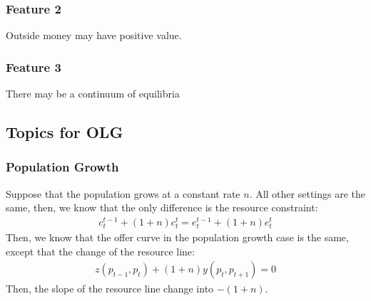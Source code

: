 \documentclass{article}
\begin{document}
\subsubsection{Feature 2}
Outside money may have positive value.

\subsubsection{Feature 3}
There may be a continuum of equilibria


\subsection{Topics for OLG}
\subsubsection{Population Growth}
Suppose that the population grows at a constant rate $n$. All other settings are the same, then, we know that the only difference is the resource constraint:
	\begin{align*}
		c^{t-1}_t + (1 + n)c^t_t = e^{t-1}_t + (1 + n)e^t_t
	\end{align*}
Then, we know that the offer curve in the population growth case is the same, except that the change of the resource line:
	\begin{align*}
		z(p_{t-1}, p_t) + (1 + n)y(p_t, p_{t+1}) = 0
	\end{align*}
Then, the slope of the resource line change into $-(1 + n)$.
\end{document}
